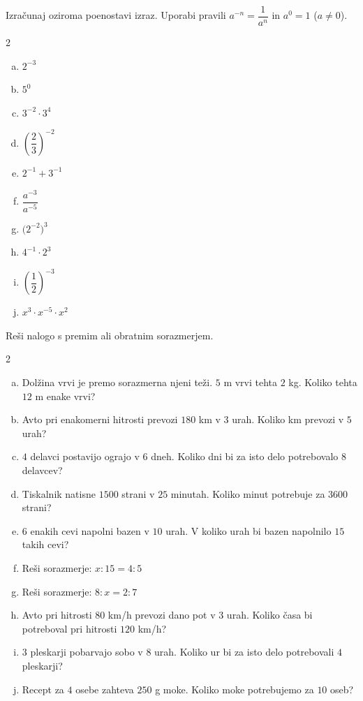 \documentclass[a4paper,12pt]{letter}
\begin{document}
\begin{naloga}
Izra\v{c}unaj oziroma poenostavi izraz. Uporabi pravili $a^{-n}=\dfrac{1}{a^n}$ in $a^0=1$ ($a\neq0$).

\begin{multicols}{2}
\begin{enumerate}[a.)]
\item $2^{-3}$
\item $5^0$
\item $3^{-2}\cdot3^4$
\item $\left(\dfrac{2}{3}\right)^{-2}$
\item $2^{-1}+3^{-1}$
\item $\dfrac{a^{-3}}{a^{-5}}$
\item $\big(2^{-2}\big)^3$
\item $4^{-1}\cdot2^3$
\item $\left(\dfrac{1}{2}\right)^{-3}$
\item $x^3\cdot x^{-5}\cdot x^2$
\end{enumerate}
\end{multicols}
\end{naloga}

\begin{naloga}
Re\v{s}i nalogo s premim ali obratnim sorazmerjem.

\begin{multicols}{2}
\begin{enumerate}[a.)]
\item Dol\v{z}ina vrvi je premo sorazmerna njeni te\v{z}i. $5$ m vrvi tehta $2$ kg. Koliko tehta $12$ m enake vrvi?
\item Avto pri enakomerni hitrosti prevozi $180$ km v $3$ urah. Koliko km prevozi v $5$ urah?
\item $4$ delavci postavijo ograjo v $6$ dneh. Koliko dni bi za isto delo potrebovalo $8$ delavcev?
\item Tiskalnik natisne $1500$ strani v $25$ minutah. Koliko minut potrebuje za $3600$ strani?
\item $6$ enakih cevi napolni bazen v $10$ urah. V koliko urah bi bazen napolnilo $15$ takih cevi?
\item Re\v{s}i sorazmerje: $x:15=4:5$
\item Re\v{s}i sorazmerje: $8:x=2:7$
\item Avto pri hitrosti $80$ km/h prevozi dano pot v $3$ urah. Koliko \v{c}asa bi potreboval pri hitrosti $120$ km/h?
\item $3$ pleskarji pobarvajo sobo v $8$ urah. Koliko ur bi za isto delo potrebovali $4$ pleskarji?
\item Recept za $4$ osebe zahteva $250$ g moke. Koliko moke potrebujemo za $10$ oseb?
\end{enumerate}
\end{multicols}
\end{naloga}
\end{document}
